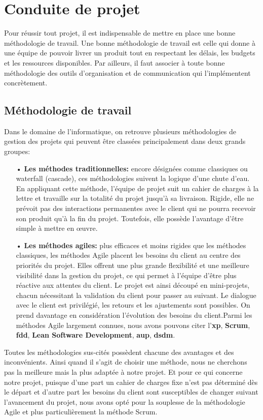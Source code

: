 \section{Conduite de projet}
Pour réussir tout projet, il est indispensable de mettre en place une bonne méthodologie de travail. Une bonne méthodologie de travail est celle qui donne à une équipe de pouvoir livrer un produit tout en respectant les délais, les budgets et les ressources disponibles. Par ailleurs, il faut associer à toute bonne méthodologie des outils d'organisation et de communication qui l'implémentent concrètement.
    \subsection{Méthodologie de travail}
    Dans le domaine de l’informatique, on retrouve plusieurs méthodologies de gestion des projets qui peuvent être classées principalement dans deux grands groupes:
        \begin{itemize}
            \item[•] \textbf{Les méthodes traditionnelles: }encore désignées comme classiques ou waterfall (cascade), ces méthodologies suivent la logique d’une chute d’eau. En appliquant cette méthode, l’équipe de projet suit un cahier de charges à la lettre et travaille sur la totalité du projet jusqu’à sa livraison. Rigide, elle ne prévoit pas des interactions permanentes avec le client qui ne pourra recevoir son produit qu’à la fin du projet. Toutefois, elle possède l’avantage d’être simple à mettre en œuvre.
            \item[•] \textbf{Les méthodes agiles: }plus efficaces et moins rigides que les méthodes classiques, les méthodes Agile placent les besoins du client au centre des priorités du projet. Elles offrent une plus grande flexibilité et une meilleure visibilité dans la gestion du projet, ce qui permet à l'équipe d'être plus réactive aux attentes du client. Le projet est ainsi découpé en mini-projets, chacun nécessitant la validation du client pour passer au suivant. Le dialogue avec le client est privilégié, les retours et les ajustements sont possibles. On prend davantage en considération l'évolution des besoins du client.Parmi les méthodes Agile largement connues, nous avons pouvons citer l'\textbf{\acrfull{xp}},
            \textbf{Scrum}, \textbf{\acrfull{fdd}}, \textbf{Lean Software Development}, \textbf{\acrfull{aup}}, \textbf{\acrfull{dsdm}}.
        \end{itemize}

        Toutes les méthodologies sus-cités possèdent chacune des avantages et des inconvénients. Ainsi quand il s’agit de choisir une méthode, nous ne cherchons pas la meilleure mais la plus adaptée à notre projet. Et pour ce qui concerne notre projet, puisque d’une part un cahier de charges fixe n’est pas déterminé dès le départ et d’autre part les besoins du client sont susceptibles de changer suivant l’avancement du projet, nous avons opté pour la souplesse de la méthodologie Agile et plus particulièrement la méthode Scrum.
        
